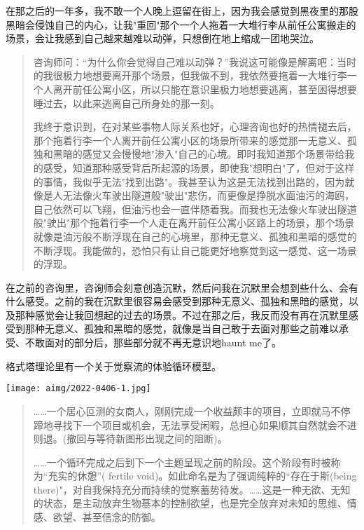 在那之后的一年多，我不敢一个人晚上逗留在街上，因为我会感觉到黑夜里的那股黑暗会侵蚀自己的内心，让我"重回"那个一个人拖着一大堆行李从前任公寓搬走的场景，会让我感到自己越来越难以动弹，只想倒在地上缩成一团地哭泣。

\blockquote{
咨询师问：“为什么你会觉得自己难以动弹？”我说这可能像是解离吧：当时的我很极力地想要离开那个场景，但我做不到，我依然要拖着一大堆行李一个人离开前任公寓小区，所以只能在意识里极力地想要逃离，甚至困得想要睡过去，以此来逃离自己所身处的那一刻。

我终于意识到，在对某些事物\pozhehao{}人际关系也好，心理咨询也好\pozhehao{}的热情褪去后，那个拖着行李一个人离开前任公寓小区的场景所带来的感觉\pozhehao{}那一无意义、孤独和黑暗的感觉又会慢慢地"渗入"自己的心境。即时我知道那个场景带给我的感受，知道那种感受背后所起源的场景，即使我"想明白"了，但对于这样的事情，我似乎无法"找到出路"。我甚至认为这是无法找到出路的，因为就像是人无法像火车驶出隧道般"驶出"悲伤，而更像是挣脱水面油污的海鸥，自己依然可以飞翔，但油污也会一直伴随着我。而我也无法像火车驶出隧道般"驶出"那个拖着行李一个人走在离开前任公寓小区路上的场景，那个场景就像是油污般不断浮现在自己的心境里，那种无意义、孤独和黑暗的感觉的不断浮现。我能做的，恐怕只有让自己能更好地察觉到这一感觉、这一场景的浮现。

}

在之前的咨询里，咨询师会刻意创造沉默，然后问我在沉默里会想到些什么、会有什么感受。之前的我在沉默里很容易会感受到那种无意义、孤独和黑暗的感觉，以及那种感觉会让我回想起的过去的场景。不过在那之后，我反而没有再在沉默里感受到那种无意义、孤独和黑暗的感觉，就像是当自己敢于去面对那些之前难以承受、不敢面对的部分后，那些部分就不再无意识地haunt me了。

格式塔理论里有一个关于觉察流的体验循环模型。

\noindent\begin{minipage}{\linewidth}
    \centering
    \vspace{3pt}
    \texttt{[image: aimg/2022-0406-1.jpg]}
    \vspace{3pt}
\end{minipage}

\blockquote{
……一个居心叵测的女商人，刚刚完成一个收益颇丰的项目，立即就马不停蹄地寻找下一个项目或机会，无法享受闲暇，总担心如果顺其自然就会不进则退。(撤回与等待新图形出现之间的阻断)。

……一个循环完成之后到下一个主题呈现之前的阶段。这个阶段有时被称为“充实的休憩”( fertile void)。如此命名是为了强调纯粹的“存在于斯(being there)"，对自我保持充分而持续的觉察蓄势待发。……这是一种无欲、无知的状态，是主动放弃生物基本的控制欲望，也是完全放弃对未知的思维、情感、欲望、甚至信念的防御。

}

